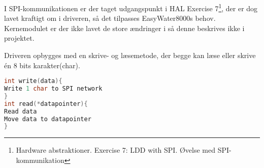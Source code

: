 I SPI-kommunikationen er der taget udgangspunkt i HAL Exercise 7\footnote{Hardware abstraktioner. Exercise 7: LDD with SPI. Øvelse med SPI-kommunikation}, der er dog lavet kraftigt om i driveren, så det tilpasses EasyWater8000s behov. Kernemodulet er der ikke lavet de store ændringer i så denne beskrives ikke i projektet.

Driveren opbygges med en skrive- og læsemetode, der begge kan læse eller skrive én 8 bits karakter(char).

\begin{lstlisting}[language=C]
int write(data){
Write 1 char to SPI network
}
int read(*datapointer){
Read data
Move data to datapointer
}
\end{lstlisting}